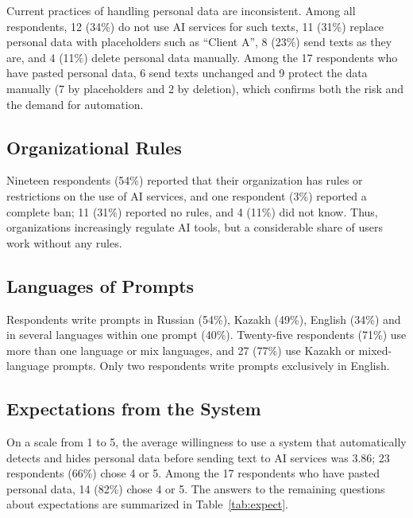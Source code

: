 \documentclass[12pt,a4paper]{article}
\begin{document}
Current practices of handling personal data are inconsistent. Among all respondents, 12 (34\%) do not use AI services for such texts, 11 (31\%) replace personal data with placeholders such as ``Client A'', 8 (23\%) send texts as they are, and 4 (11\%) delete personal data manually. Among the 17 respondents who have pasted personal data, 6 send texts unchanged and 9 protect the data manually (7 by placeholders and 2 by deletion), which confirms both the risk and the demand for automation.

\subsection{Organizational Rules}

Nineteen respondents (54\%) reported that their organization has rules or restrictions on the use of AI services, and one respondent (3\%) reported a complete ban; 11 (31\%) reported no rules, and 4 (11\%) did not know. Thus, organizations increasingly regulate AI tools, but a considerable share of users work without any rules.

\subsection{Languages of Prompts}

Respondents write prompts in Russian (54\%), Kazakh (49\%), English (34\%) and in several languages within one prompt (40\%). Twenty-five respondents (71\%) use more than one language or mix languages, and 27 (77\%) use Kazakh or mixed-language prompts. Only two respondents write prompts exclusively in English.

\subsection{Expectations from the System}

On a scale from 1 to 5, the average willingness to use a system that automatically detects and hides personal data before sending text to AI services was 3.86; 23 respondents (66\%) chose 4 or 5. Among the 17 respondents who have pasted personal data, 14 (82\%) chose 4 or 5. The answers to the remaining questions about expectations are summarized in Table~\ref{tab:expect}.
\end{document}
